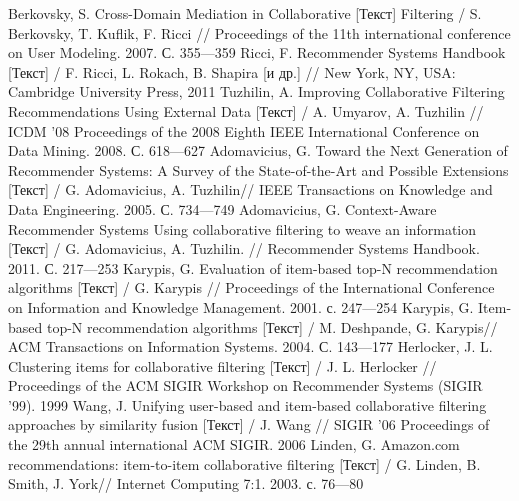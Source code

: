 \begin{thebibliography}{119}
 Berkovsky, S. Cross-Domain Mediation in Collaborative [Текст] 
Filtering / S. Berkovsky, T. Kuflik, F. Ricci
// Proceedings of the 11th international conference on User Modeling.
2007. С. 355---359
 Ricci, F. Recommender Systems Handbook [Текст]  / F. Ricci, L. Rokach, B. Shapira [и др.] // New
York, NY, USA: Cambridge University Press, 2011
 Tuzhilin, A. Improving Collaborative Filtering Recommendations
Using External Data [Текст]  / A. Umyarov, A. Tuzhilin // ICDM ’08 Proceedings of the 2008 Eighth IEEE
International Conference on Data Mining. 2008. С. 618---627
 Adomavicius, G. Toward the Next Generation of Recommender
Systems: A Survey of the State-of-the-Art and Possible Extensions [Текст]  / G. Adomavicius, A. Tuzhilin// IEEE
Transactions on Knowledge and Data Engineering. 2005. С. 734---749
 Adomavicius, G. Context-Aware Recommender Systems Using
collaborative filtering to weave an information [Текст]  / G. Adomavicius, A. Tuzhilin. // Recommender Systems
Handbook. 2011. С. 217---253
 Karypis, G. Evaluation of item-based top-N recommendation algorithms [Текст]  / G. Karypis //
Proceedings of the International Conference on Information and Knowledge
Management. 2001. с. 247---254
 Karypis, G. Item-based top-N recommendation algorithms [Текст]  / M. Deshpande, G. Karypis// ACM
Transactions on Information Systems. 2004. С. 143---177
 Herlocker, J. L. Clustering items for collaborative filtering [Текст]  / J. L. Herlocker // Proceedings of
the ACM SIGIR Workshop on Recommender Systems (SIGIR ’99). 1999
 Wang, J. Unifying user-based and item-based collaborative filtering approaches
by similarity fusion [Текст]  / J. Wang // SIGIR ’06 Proceedings of the 29th annual international
ACM SIGIR. 2006
 Linden, G. Amazon.com recommendations: item-to-item
collaborative filtering [Текст]  / G. Linden, B. Smith, J. York// Internet Computing 7:1. 2003. с. 76---80



\end{thebibliography}

